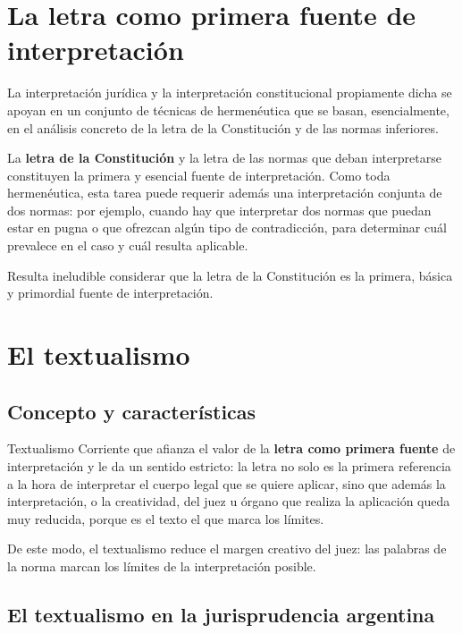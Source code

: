 \documentclass[12pt,oneside]{book}
\begin{document}
\section{La letra como primera fuente de interpretación}

La interpretación jurídica y la interpretación constitucional propiamente dicha se apoyan en un conjunto de técnicas de hermenéutica que se basan, esencialmente, en el análisis concreto de la letra de la Constitución y de las normas inferiores.

La \textbf{letra de la Constitución} y la letra de las normas que deban interpretarse constituyen la primera y esencial fuente de interpretación. Como toda hermenéutica, esta tarea puede requerir además una interpretación conjunta de dos normas: por ejemplo, cuando hay que interpretar dos normas que puedan estar en pugna o que ofrezcan algún tipo de contradicción, para determinar cuál prevalece en el caso y cuál resulta aplicable.

Resulta ineludible considerar que la letra de la Constitución es la primera, básica y primordial fuente de interpretación.

\section{El textualismo}

\subsection{Concepto y características}

\begin{definition}{Textualismo}
Corriente que afianza el valor de la \textbf{letra como primera fuente} de interpretación y le da un sentido estricto: la letra no solo es la primera referencia a la hora de interpretar el cuerpo legal que se quiere aplicar, sino que además la interpretación, o la creatividad, del juez u órgano que realiza la aplicación queda muy reducida, porque es el texto el que marca los límites.
\end{definition}

De este modo, el textualismo reduce el margen creativo del juez: las palabras de la norma marcan los límites de la interpretación posible.

\subsection{El textualismo en la jurisprudencia argentina}
\end{document}
